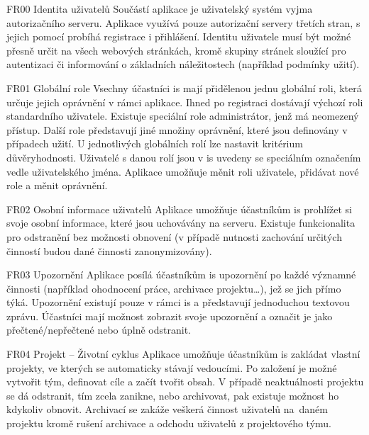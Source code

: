 \begin{dl}
   \item[FR00 Identita uživatelů]
   Součástí aplikace je uživatelský systém vyjma autorizačního serveru. Aplikace využívá pouze autorizační servery třetích stran, s jejich pomocí probíhá registrace i přihlášení. Identitu uživatele musí být možné přesně určit na všech webových stránkách, kromě skupiny stránek sloužící pro autentizaci či informování o základních náležitostech (například podmínky užití).

   \item[FR01 Globální role]
   Vsechny účastníci \gls{is} mají přidělenou jednu globální roli, která určuje jejich oprávnění v rámci aplikace. Ihned po registraci dostávají výchozí roli standardního uživatele. Existuje speciální role administrátor, jenž má neomezený přístup. Další role představují jiné množiny oprávnění, které jsou definovány v případech užití. U jednotlivých globálních rolí lze nastavit kritérium důvěryhodnosti. Uživatelé s danou rolí jsou v \gls{is} uvedeny se speciálním označením vedle uživatelského jména. Aplikace umožňuje měnit roli uživatele, přidávat nové role a měnit oprávnění.

   \item[FR02 Osobní informace uživatelů]
   Aplikace umožňuje účastníkům \gls{is} prohlížet si svoje osobní informace, které jsou uchovávány na serveru. Existuje funkcionalita pro odstranění bez možnosti obnovení (v případě nutnosti zachování určitých činností budou dané činnosti zanonymizovány).

   \item[FR03 Upozornění]
   Aplikace posílá účastníkům \gls{is} upozornění po každé významné činnosti (například ohodnocení práce, archivace projektu\dots{}), jež se jich přímo týká. Upozornění existují pouze v rámci \gls{is} a představují jednoduchou textovou zprávu. Účastníci mají možnost zobrazit svoje upozornění a označit je jako přečtené/nepřečtené nebo úplně odstranit.

   \item[FR04 Projekt -- Životní cyklus]
   Aplikace umožňuje účastníkům \gls{is} zakládat vlastní projekty, ve kterých se automaticky stávají vedoucími. Po založení je možné vytvořit tým, definovat cíle a začít tvořit obsah. V případě neaktuálnosti projektu se dá odstranit, tím zcela zanikne, nebo archivovat, pak existuje možnost ho kdykoliv obnovit. Archivací se zakáže veškerá činnost uživatelů na~daném projektu kromě rušení archivace a odchodu uživatelů z projektového týmu.


\end{dl}
